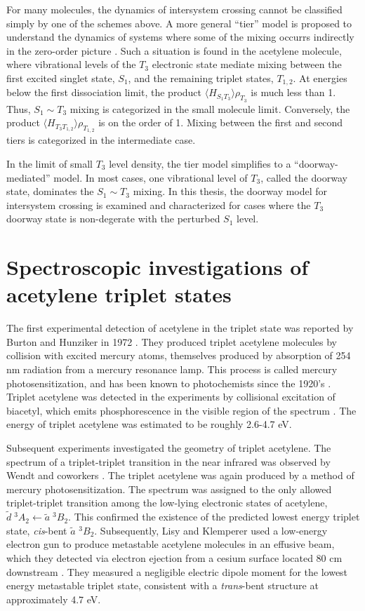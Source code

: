 \documentclass[12pt]{mitthesis}
\begin{document}
For many molecules, the dynamics of intersystem crossing cannot be
classified simply by one of the schemes above.  A more general
``tier'' model is proposed to understand the dynamics of systems where
some of the mixing occurrs indirectly in the zero-order picture
\cite{stuchebrukhov93a, stuchebrukhov93b}.  Such a situation is found
in the acetylene molecule, where vibrational levels of the $T_3$
electronic state mediate mixing between the first excited singlet
state, $S_1$, and the remaining triplet states, $T_{1,2}$.  At
energies below the first dissociation limit, the product $\langle
H_{S_1 T_3} \rangle \rho_{T_3}$ is much less than 1.  Thus, $S_1 \sim
T_3$ mixing is categorized in the small molecule limit.  Conversely,
the product $\langle H_{T_3 T_{1,2}} \rangle \rho_{T_{1,2}}$ is on the
order of 1.  Mixing between the first and second tiers is categorized
in the intermediate case.

In the limit of small $T_3$ level density, the tier model simplifies
to a ``doorway-mediated'' model.  In most cases, one vibrational level
of $T_3$, called the doorway state, dominates the $S_1 \sim T_3$
mixing.  In this thesis, the doorway model for intersystem crossing is
examined and characterized for cases where the $T_3$ doorway state is
non-degerate with the perturbed $S_1$ level.

\section{Spectroscopic investigations of acetylene triplet states}

The first experimental detection of acetylene in the triplet state was
reported by Burton and Hunziker in 1972 \cite{burton72}.  They
produced triplet acetylene molecules by collision with excited mercury
atoms, themselves produced by absorption of 254 nm radiation from a
mercury resonance lamp.  This process is called mercury
photosensitization, and has been known to photochemists since the
1920's \cite{cairo22}.  Triplet acetylene was detected in the
experiments by collisional excitation of biacetyl, which emits
phosphorescence in the visible region of the spectrum \cite{burton72}.
The energy of triplet acetylene was estimated to be roughly 2.6-4.7
eV.

Subsequent experiments investigated the geometry of triplet acetylene.
The spectrum of a triplet-triplet transition in the near infrared was
observed by Wendt and coworkers \cite{wendt79}.  The triplet acetylene
was again produced by a method of mercury photosensitization.  The
spectrum was assigned to the only allowed triplet-triplet transition
among the low-lying electronic states of acetylene, $\tilde{d} \;
^3A_2 \leftarrow \tilde{a} \; ^3B_2$.  This confirmed the existence of
the predicted lowest energy triplet state, \emph{cis}-bent $\tilde{a}$
$^3B_2$.  Subsequently, Lisy and Klemperer used a low-energy electron
gun to produce metastable acetylene molecules in an effusive beam,
which they detected via electron ejection from a cesium surface
located 80 cm downstream \cite{lisy80, hemminger76}.  They measured a
negligible electric dipole moment for the lowest energy metastable
triplet state, consistent with a \emph{trans}-bent structure at
approximately 4.7 eV.
\end{document}
